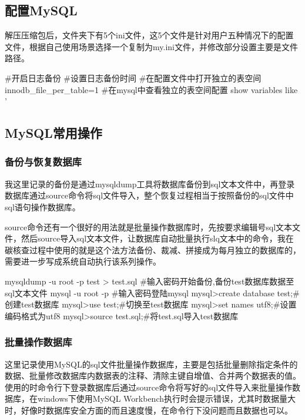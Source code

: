 \subsection{配置MySQL}
解压压缩包后，文件夹下有5个ini文件，这5个文件是针对用户五种情况下的配置文件，根据自己使用场景选择一个复制为my.ini文件，并修改部分设置主要是文件路径。
\begin{shell}
#开启日志备份
#设置日志备份时间
#在配置文件中打开独立的表空间
innodb_file_per_table=1
#在mysql中查看独立的表空间配置
show variables like '%
\end{shell}
\subsection{MySQL常用操作}
\subsubsection{备份与恢复数据库}
我这里记录的备份是通过mysqldump工具将数据库备份到sql文本文件中，再登录数据库通过source命令将sql文件导入，整个恢复过程相当于按照备份的sql文件中sql语句操作数据库。

source命令还有一个很好的用法就是批量操作数据库时，先按要求编辑号sql文本文件，然后source导入sql文本文件，让数据库自动批量执行slq文本中的命令，我在碳核查过程中使用的就是这个法方法备份、裁减、拼接成为每月独立的数据库的，需要进一步写成系统自动执行该系列操作。
\begin{shell}
mysqldump -u root -p test > test.sql
#输入密码开始备份,备份test数据库数据至sql文本文件
mysql -u root -p
#输入密码登陆mysql
mysql>create database test;#创建test数据库
mysql>use test;#切换至test数据库
mysql>set names utf8;#设置编码格式为utf8
mysql>source test.sql;#将test.sql导入test数据库
\end{shell}
\subsubsection{批量操作数据库}
这里记录使用MySQL的sql文件批量操作数据库，主要是包括批量删除指定条件的数据、批量修改数据库内数据表的注释、清除主键自增值、合并两个数据表的值。使用的时命令行下登录数据库后通过source命令将写好的sql文件导入来批量操作数据库，在windows下使用MySQL Workbench执行时会提示错误，尤其时数据量大时，好像时数据库安全方面的而且速度慢，在命令行下没问题而且数据也可以。

